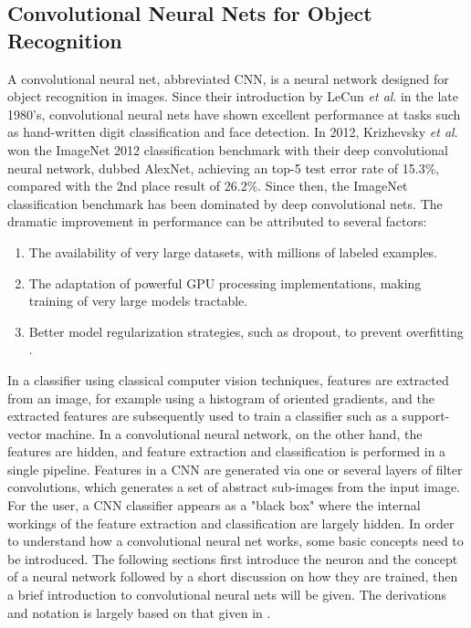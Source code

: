 \subsection{Convolutional Neural Nets for Object Recognition}
A convolutional neural net, abbreviated CNN, is a neural network designed for object recognition in images. Since their introduction by LeCun \textit{et al}. \cite{lecun-89e} in the late 1980's, convolutional neural nets have shown excellent performance at tasks such as hand-written digit classification and face detection. In 2012, Krizhevsky \textit{et al}. \cite{NIPS2012_4824} won the ImageNet 2012 classification benchmark with their deep convolutional neural network, dubbed AlexNet, achieving an top-5 test error rate of 15.3\%, compared with the 2nd place result of 26.2\%. Since then, the ImageNet classification benchmark has been dominated by deep convolutional nets. The dramatic improvement in performance can be attributed to several factors:
\begin{enumerate}
	\item The availability of very large datasets, with millions of labeled examples.
	\item The adaptation of powerful GPU processing implementations, making training of very large models tractable.
	\item Better model regularization strategies, such as dropout, to prevent overfitting \cite{dropout}.
\end{enumerate}
In a classifier using classical computer vision techniques, features are extracted from an image, for example using a histogram of oriented gradients, and the extracted features are subsequently used to train a classifier such as a support-vector machine. In a convolutional neural network, on the other hand, the features are hidden, and feature extraction and classification is performed in a single pipeline. Features in a CNN are generated via one or several layers of filter convolutions, which generates a set of abstract sub-images from the input image. For the user, a CNN classifier appears as a "black box" where the internal workings of the feature extraction and classification are largely hidden. In order to understand how a convolutional neural net works, some basic concepts need to be introduced. The following sections first introduce the neuron and the concept of a neural network followed by a short discussion on how they are trained, then a brief introduction to convolutional neural nets will be given. The derivations and notation is largely based on that given in \cite{machine_learning}.
